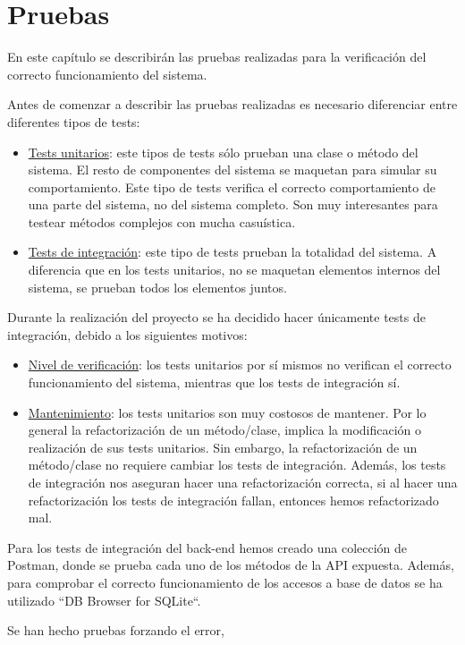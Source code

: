 \chapter{Pruebas}
\label{chap:pruebas}

En este capítulo se describirán las pruebas realizadas para la verificación del correcto funcionamiento del sistema.

Antes de comenzar a describir las pruebas realizadas es necesario diferenciar entre diferentes tipos de tests:
\begin{itemize}
\item\underline{Tests unitarios}: este tipos de tests sólo prueban una clase o método del sistema. El resto de componentes del sistema se
maquetan para simular su comportamiento. Este tipo de tests verifica el correcto comportamiento de una parte del sistema, no del sistema
completo. Son muy interesantes para testear métodos complejos con mucha casuística.
\item\underline{Tests de integración}: este tipo de tests prueban la totalidad del sistema. A diferencia que en los tests unitarios, no se
maquetan elementos internos del sistema, se prueban todos los elementos juntos.
\end{itemize}

Durante la realización del proyecto se ha decidido hacer únicamente tests de integración, debido a los siguientes motivos:
\begin{itemize}
\item\underline{Nivel de verificación}: los tests unitarios por sí mismos no verifican el correcto funcionamiento del sistema, mientras que los tests de integración sí.
\item\underline{Mantenimiento}: los tests unitarios son muy costosos de mantener. Por lo general la refactorización de un método/clase, implica la 
modificación o realización de sus tests unitarios. Sin embargo, la refactorización de un método/clase no requiere cambiar los tests de integración. Además,
los tests de integración nos aseguran hacer una refactorización correcta, si al hacer una refactorización los tests de integración fallan, entonces hemos 
refactorizado mal. 

\end{itemize}

\label{sect:sistemasreferencia}

Para los tests de integración del back-end hemos creado una colección de Postman, donde se prueba cada uno de los métodos de la API expuesta. Además, para 
comprobar el correcto funcionamiento de los accesos a base de datos se ha utilizado ``DB Browser for SQLite``.


Se han hecho pruebas forzando el error, 

\label{sect:escenarios_pruebas}
 

